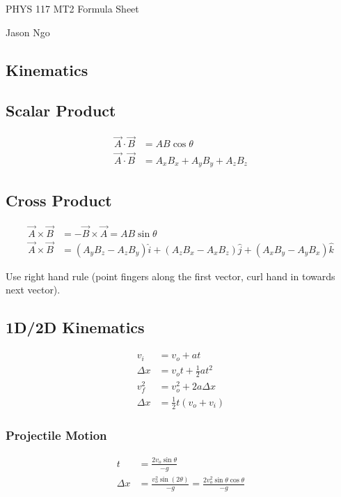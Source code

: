 \documentclass[letterpaper,10pt]{article}
\begin{document}
PHYS 117 MT2 Formula Sheet

Jason Ngo

\begin{multicols}{2}
\section{Kinematics}
\subsection{Scalar Product}
\begin{align*}
    \vec{A} \cdot \vec{B} &= AB \cos \theta \\
    \vec{A} \cdot \vec{B} &= A_x B_x + A_y B_y + A_z B_z
\end{align*}

\subsection{Cross Product}
\begin{align*}
    \vec{A} \times \vec{B} &= - \vec{B} \times \vec{A} = AB \sin \theta \\
    \vec{A} \times \vec{B} &= \left( A_y B_z - A_z B_y \right) \hat{i}
                            + \left( A_z B_x - A_x B_z \right) \hat{j}
                            + \left( A_x B_y - A_y B_x \right) \hat{k}
\end{align*}

Use right hand rule (point fingers along the first vector, curl hand in towards next vector).

\subsection{1D/2D Kinematics}
\begin{align*}
    v_i &= v_o + at \\
    \Delta x &= v_o t + \tfrac{1}{2} at^2 \\
    v_f^2 &= v_o^2 + 2 a \Delta x \\
    \Delta x &= \tfrac{1}{2} t \left( v_o + v_i \right)
\end{align*}

\subsubsection{Projectile Motion}
\begin{align*}
    t &= \frac{2 v_o \sin \theta}{-g} \\
    \Delta x &= \frac{v_o^2 \sin \left( 2 \theta \right)}{-g}
              = \frac{2 v_o^2 \sin \theta \cos \theta}{-g} \\
\end{align*}


\end{multicols}
\end{document}
